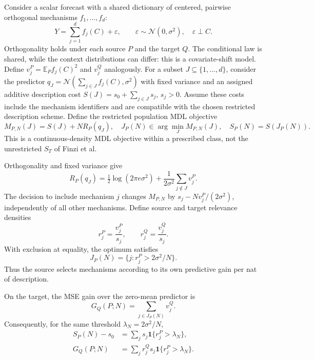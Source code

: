 \documentclass[10pt,a4paper]{article}
\theoremstyle{definition}
\begin{document}
Consider a scalar forecast with a shared dictionary of centered,
pairwise orthogonal mechanisms $f_1,\ldots,f_d$:
\begin{equation}
 Y=\sum_{j=1}^d f_j(C)+\varepsilon,\qquad
 \varepsilon\sim\mathcal N(0,\sigma^2),\quad
 \varepsilon\perp C.
 \label{eq:pt-mechanisms}
\end{equation}
Orthogonality holds under each source $P$ and the target $Q$.
The conditional law is shared, while the context distributions
can differ: this is a covariate-shift model. Define
$v_j^P=\mathbb E_P f_j(C)^2$ and $v_j^Q$ analogously.
For a subset $J\subseteq\{1,\ldots,d\}$, consider the predictor
$q_J=\mathcal N(\sum_{j\in J}f_j(C),\sigma^2)$ with fixed variance
and an assigned additive description cost
$S(J)=s_0+\sum_{j\in J}s_j$, $s_j>0$.
Assume these costs include the mechanism identifiers and are
compatible with the chosen restricted description scheme.
Define the restricted population MDL objective
\[
 M_{P,N}(J)=S(J)+NR_P(q_J),\quad
 J_P(N)\in\arg\min_J M_{P,N}(J),\quad S_P(N)=S(J_P(N)).
\]
This is a continuous-density MDL objective within a prescribed
class, not the unrestricted $S_T$ of Finzi et al.

Orthogonality and fixed variance give
\[
 R_P(q_J)=\tfrac12\log(2\pi e\sigma^2)
             +\frac{1}{2\sigma^2}\sum_{j\notin J}v_j^P.
\]
The decision to include mechanism $j$ changes $M_{P,N}$ by
$s_j-Nv_j^P/(2\sigma^2)$, independently of all other mechanisms.
Define source and target relevance densities
\[
 r_j^P=\frac{v_j^P}{s_j},\qquad r_j^Q=\frac{v_j^Q}{s_j}.
\]
With exclusion at equality, the optimum satisfies
\begin{equation}
 J_P(N)=\{j:r_j^P>2\sigma^2/N\}.
 \label{eq:pt-threshold}
\end{equation}
Thus the source selects mechanisms according to its own predictive
gain per nat of description.

On the target, the MSE gain over the zero-mean predictor is
\[
 G_Q(P;N)=\sum_{j\in J_P(N)}v_j^Q.
\]
Consequently, for the same threshold $\lambda_N=2\sigma^2/N$,
\begin{equation}
 \begin{aligned}
 S_P(N)-s_0&=\sum_j s_j\mathbf 1\{r_j^P>\lambda_N\},\\
 G_Q(P;N)&=\sum_j r_j^Qs_j\mathbf 1\{r_j^P>\lambda_N\}.
 \end{aligned}
 \label{eq:pt-selection-transfer}
\end{equation}
\end{document}
